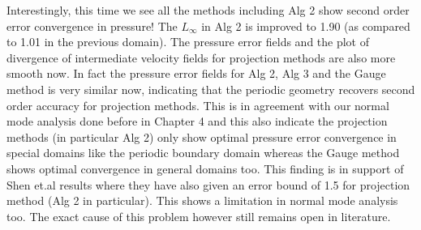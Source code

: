 Interestingly, this time we see all the methods including Alg 2 show second order error convergence in pressure! The $L_\infty$ in Alg 2 is improved to 1.90 (as compared to 1.01 in the previous domain). The pressure error fields and the plot of divergence of intermediate velocity fields for projection methods are also more smooth now. In fact the pressure error fields for Alg 2, Alg 3 and the Gauge method is very similar now, indicating that the periodic geometry recovers second order accuracy for projection methods. This is in agreement with our normal mode analysis done before in Chapter 4 and this also indicate the projection methods (in particular Alg 2) only show optimal pressure error convergence in special domains like the periodic boundary domain whereas the Gauge method shows optimal convergence in general domains too. This finding is in support of Shen et.al results \cite{guermond2004error, guermond2006overview} where they have also given an error bound of 1.5 for projection method (Alg 2 in particular). This shows a limitation in normal mode analysis too. The exact cause of this problem however still remains open in literature.\\

